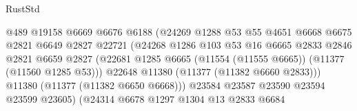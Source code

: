 \begin{lexlean}{RustStd}
\begin{coremodule}
                                          @489
                                          @19158
                                          @6669
                                          @6676
                                          @6188
                                          (@24269
                                            @1288
                                            @53
                                            @55
                                            @4651
                                            @6668
                                            @6675
                                            @2821
                                            @6649
                                            @2827
                                            @22721
                                            (@24268
                                              @1286
                                              @103
                                              @53
                                              @16
                                              @6665
                                              @2833
                                              @2846
                                              @2821
                                              @6659
                                              @2827
                                              (@22681
                                                @1285
                                                @6665
                                                (@11554 (@11555 @6665))
                                                (@11377 (@11560 @1285 @53)))
                                              @22648
                                              @11380
                                              (@11377 (@11382 @6660 @2833)))
                                            @11380
                                            (@11377 (@11382 @6650 @6668)))
                                          @23584
                                          @23587
                                          @23590
                                          @23594
                                          @23599
                                          @23605)
                                        (@24314
                                          @6678
                                          @1297
                                          @1304
                                          @13
                                          @2833
                                          @6684

\end{coremodule}
\end{lexlean}

